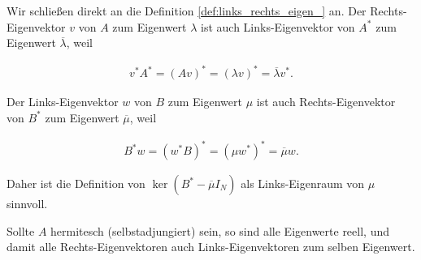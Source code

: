 \begin{remark} \label{rem:links_rechts_eigen_}

    Wir schließen direkt an die Definition \ref{def:links_rechts_eigen_} an.
    Der Rechts-Eigenvektor $v$ von $A$ zum Eigenwert $\lambda$ ist auch Links-Eigenvektor von $A^\ast$ zum Eigenwert $\overline \lambda$, weil

    \begin{align*}
        v^\ast A^\ast
        =
        (A v)^\ast
        =
        (\lambda v)^\ast
        =
        \overline \lambda v^\ast.
    \end{align*}

    Der Links-Eigenvektor $w$ von $B$ zum Eigenwert $\mu$ ist auch Rechts-Eigenvektor von $B^\ast$ zum Eigenwert $\overline \mu$, weil

    \begin{align*}
        B^\ast w
        =
        (w^\ast B)^\ast
        =
        (\mu w^\ast)^\ast
        =
        \overline \mu w.
    \end{align*}

    Daher ist die Definition von $\ker (B^\ast - \overline \mu I_N)$ als Links-Eigenraum von $\mu$ sinnvoll.

    Sollte $A$ hermitesch (selbstadjungiert) sein, so sind alle Eigenwerte reell, und damit alle Rechts-Eigenvektoren auch Links-Eigenvektoren zum selben Eigenwert.

\end{remark}

\begin{comment}

    $A^\ast$ ist tatsächlich die Adjungierte von $A$ im Sinne der Funktionalanalysis, weil $\Forall x, y \in \C^N:$

    \begin{align*}
        (A x, y)_2
        =
        y^\ast A x
        =
        (A^\ast y)^\ast x
        =
        (x, A^\ast y)_2.
    \end{align*}

    Nun ist $\overline \lambda$ Eigenwert von $A^\ast$ mit derselben algebraischen Vielfachheit wie $\lambda$, weil

    \begin{align*}
        \chi_{A^\ast}(\lambda)
        =
        \det(A^\ast - \lambda I_N)
        =
        \overline{\det(A - \lambda I_N)^\top}
        =
        \overline{\chi_A(\lambda)}.
    \end{align*}

\end{comment}
